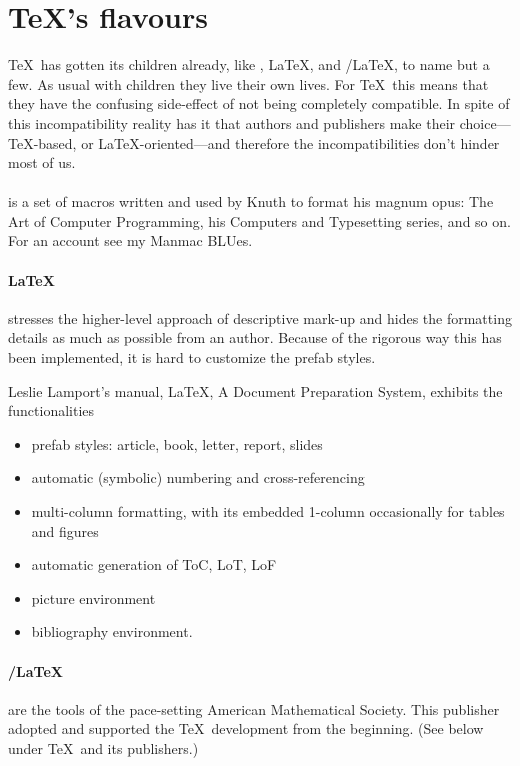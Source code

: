 \section{\TeX's flavours}
\TeX\ has gotten its children already, like \mm, \LaTeX, and
\AmSTeX/\LaTeX, to name but a few.
As usual with children they live their own lives.
For \TeX\ this means that they have the confusing
side-effect of not being completely compatible.
In spite of this incompatibility reality has it that authors and publishers
make their choice---\TeX-based, or \LaTeX-oriented---and therefore
the incompatibilities don't hinder most of us.

\paragraph*{\mmt} is a set of macros
written and used by Knuth to format his magnum opus:
The Art of Computer Programming,
his Computers and Typesetting series,
and so on. For an account see my Manmac BLUes.

\paragraph*{\LaTeX}stresses the higher-level approach of descriptive mark-up
and hides the formatting details as much as possible from an author.
Because of the rigorous way this has been implemented,
it is  hard to customize the prefab styles.

Leslie Lamport's manual, \LaTeX, A Document Preparation System,
exhibits the functionalities
\begin{itemize}
\item prefab styles: article, book, letter, report, slides
\item automatic (symbolic) numbering and cross-referencing
\item multi-column formatting, with its embedded 1-column occasionally
      for tables and figures
\item automatic generation of ToC, LoT, LoF
\item picture environment
\item bibliography environment.
\end{itemize}

\paragraph*{\AmSTeX/\LaTeX}are the tools of the
pace-setting American Mathematical Society. This publisher adopted
and supported the \TeX\ development from the beginning. (See below
under \TeX\ and its publishers.)

